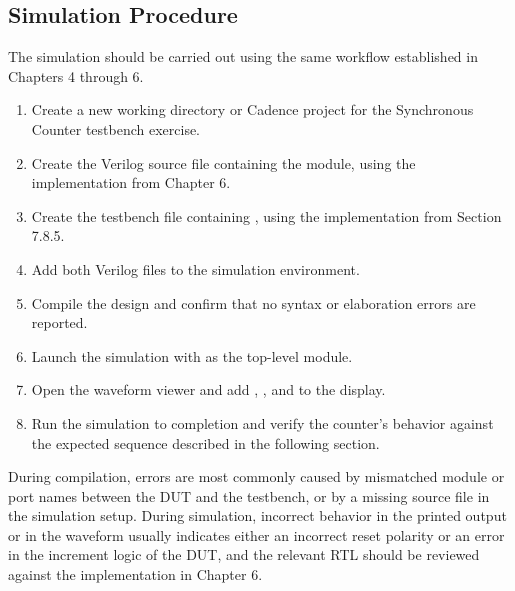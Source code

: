 \subsection{Simulation Procedure}

The simulation should be carried out using the same workflow established in Chapters 4 through 6.

\begin{enumerate}
    \item Create a new working directory or Cadence project for the Synchronous Counter testbench exercise.
    \item Create the Verilog source file containing the  module, using the implementation from Chapter 6.
    \item Create the testbench file containing , using the implementation from Section 7.8.5.
    \item Add both Verilog files to the simulation environment.
    \item Compile the design and confirm that no syntax or elaboration errors are reported.


    \item Launch the simulation with  as the top-level module.


    \item Open the waveform viewer and add , , and  to the display.


    \item Run the simulation to completion and verify the counter's behavior against the expected sequence described in the following section.
\end{enumerate}

During compilation, errors are most commonly caused by mismatched module or port names between the DUT and the testbench, or by a missing source file in the simulation setup. During simulation, incorrect behavior in the printed  output or in the waveform usually indicates either an incorrect reset polarity or an error in the increment logic of the DUT, and the relevant RTL should be reviewed against the implementation in Chapter 6.

